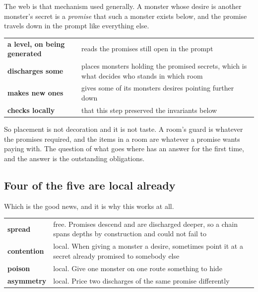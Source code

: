 \documentclass[11pt,a4paper]{article}
\begin{document}
The web is that mechanism used generally. A monster whose desire is another monster's secret is a
\emph{promise} that such a monster exists below, and the promise travels down in the prompt like
everything else.

\begin{center}
\begin{tabular}{@{}l@{\hspace{4mm}}>{\raggedright\arraybackslash}p{}@{}}
\toprule
\textbf{a level, on being generated} & reads the promises still open in the prompt \\[1mm]
\textbf{discharges some} & places monsters holding the promised secrets, which is what decides who
stands in which room \\[1mm]
\textbf{makes new ones} & gives some of its monsters desires pointing further down \\[1mm]
\textbf{checks locally} & that this step preserved the invariants below \\
\bottomrule
\end{tabular}
\end{center}

So placement is not decoration and it is not taste. A room's guard is whatever the promises
required, and the items in a room are whatever a promise wants paying with. The question of what
goes where has an answer for the first time, and the answer is the outstanding obligations.

\subsection{Four of the five are local already}

Which is the good news, and it is why this works at all.

\begin{center}
\begin{tabular}{@{}l@{\hspace{4mm}}>{\raggedright\arraybackslash}p{}@{}}
\toprule
\textbf{spread}     & free. Promises descend and are discharged deeper, so a chain spans depths by
construction and could not fail to \\[1mm]
\textbf{contention} & local. When giving a monster a desire, sometimes point it at a secret already
promised to somebody else \\[1mm]
\textbf{poison}     & local. Give one monster on one route something to hide \\[1mm]
\textbf{asymmetry}  & local. Price two discharges of the same promise differently \\
\bottomrule
\end{tabular}
\end{center}
\end{document}

